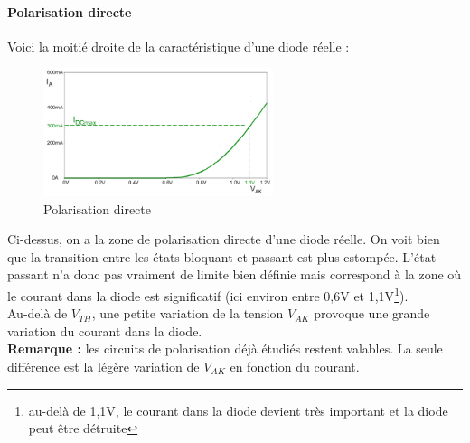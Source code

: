 \documentclass[a4paper]{article}
\begin{document}
    \paragraph{Polarisation directe}
    Voici la moitié droite de la caractéristique d'une diode réelle :
    \begin{figure}[H]
        \begin{center}
            \includegraphics[width=0.6\textwidth]{fig/5_dioderpolarisationdirecte.png}
            \caption{Polarisation directe}
            \label{fig:5_dioderpolarisationdirecte}
        \end{center}
    \end{figure}
    Ci-dessus, on a la zone de polarisation directe d'une diode réelle. On voit
    bien que la transition entre les états bloquant et passant est plus estompée.
    L'état passant n'a donc pas vraiment de limite bien définie mais correspond
    à la zone où le courant dans la diode est significatif (ici environ entre 0,6V et 
    1,1V\footnote{au-delà de 1,1V, le courant dans la diode devient très important
    et la diode peut être détruite}).\\

    Au-delà de $V_{TH}$, une petite variation de la tension $V_{AK}$ provoque une
    grande variation du courant dans la diode.\\

    \textbf{Remarque :} les circuits de polarisation déjà étudiés restent valables.
    La seule différence est la légère variation de $V_{AK}$ en fonction du courant.
\end{document}
